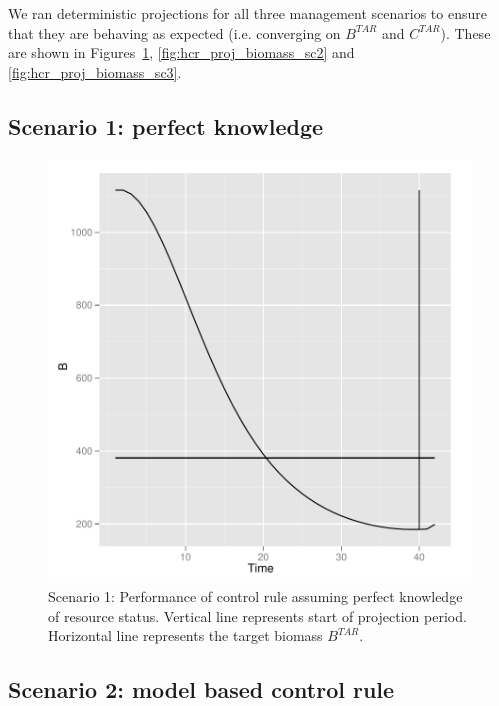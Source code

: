 \documentclass[a4paper]{article}
\begin{document}
We ran deterministic projections for all three management scenarios to ensure that they are behaving as expected (i.e. converging on $B^{TAR}$ and $C^{TAR}$).
These are shown in Figures~\ref{fig:hcr_proj_biomass_sc1}, \ref{fig:hcr_proj_biomass_sc2} and \ref{fig:hcr_proj_biomass_sc3}.

\subsection{Scenario 1: perfect knowledge}


\begin{figure}
\centering
\includegraphics{script-hcr_plot_sc1}
\caption{Scenario 1: Performance of control rule assuming perfect knowledge of resource status. Vertical line represents start of projection period. 
Horizontal line represents the target biomass $B^{TAR}$.}
\label{fig:hcr_proj_biomass_sc1}
\end{figure}

\subsection{Scenario 2: model based control rule}
\end{document}
